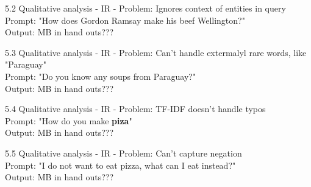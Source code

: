 \documentclass{beamer}
\begin{document}
\begin{frame} {5.2 Qualitative analysis - IR - }
  Problem: Ignores context of entities in query\\
  Prompt: "How does Gordon Ramsay make his beef Wellington?"\\
  Output: MB in hand outs???
\end{frame}

\begin{frame} {5.3 Qualitative analysis - IR - }
  Problem: Can't handle extermalyl rare words, like "Paraguay"\\
  Prompt: "Do you know any soups from Paraguay?"\\
  Output: MB in hand outs???
\end{frame}

\begin{frame} {5.4 Qualitative analysis - IR - }
  Problem: TF-IDF doesn't handle typos\\
  Prompt: "How do you make \textbf{piza}"\\
  Output: MB in hand outs???
\end{frame}

\begin{frame} {5.5 Qualitative analysis - IR - }
  Problem: Can't capture negation\\
  Prompt:  "I do not want to eat pizza, what can I eat instead?"\\
  Output: MB in hand outs???
\end{frame}
\end{document}
